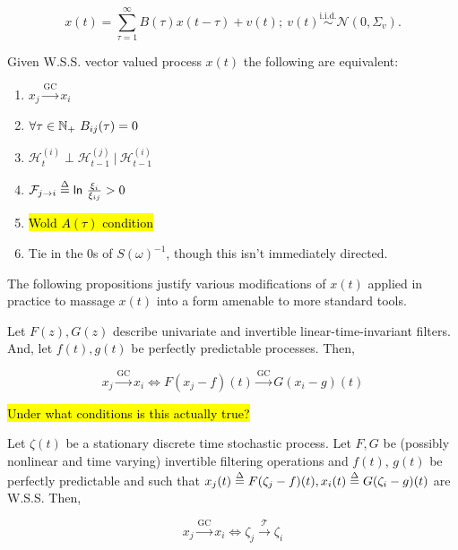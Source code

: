 \documentclass[12pt]{article}
\def\gc{\overset{\text{GC}}{\rightarrow}}
\def\te{\overset{\mathcal{T}}{\rightarrow}}
\begin{document}
\begin{equation}
  x(t) = \sum_{\tau = 1}^\infty B(\tau) x(t - \tau) + v(t);\ v(t) \overset{\text{i.i.d.}}{\sim} \mathcal{N}(0, \Sigma_v).
\end{equation}

\begin{theorem}
  Given W.S.S. vector valued process $x(t)$ the following are equivalent:

  \begin{enumerate}
    \item{$x_j \gc x_i$}
    \item{$\forall \tau \in \N_+\ B_{ij}(\tau) = 0$}
    \item{$\mathcal{H}_t^{(i)} \perp \mathcal{H}_{t - 1}^{(j)}\ |\ \mathcal{H}_{t - 1}^{(i)}$}
    \item{$\mathcal{F}_{j \rightarrow i} \overset{\Delta}{=} \mathsf{ln\ }\frac{\xi_i}{\xi_{ij}} > 0$}
    \item{\hl{Wold $A(\tau)$ condition}}
    \item{Tie in the 0s of $S(\omega)^{-1}$, though this isn't immediately directed.}
  \end{enumerate}
\end{theorem}

The following propositions justify various modifications of $x(t)$
applied in practice to massage $x(t)$ into a form amenable to more
standard tools.

\begin{theorem}
  Let $F(z), G(z)$ describe univariate and invertible
  linear-time-invariant filters.  And, let $f(t), g(t)$ be perfectly
  predictable processes.  Then,

  \begin{equation}
    x_j \gc x_i \iff F(x_j - f)(t) \gc G(x_i - g)(t)
  \end{equation}
\end{theorem}

\begin{theorem}
  \hl{Under what conditions is this actually true?}

  Let $\zeta(t)$ be a stationary discrete time stochastic process.  Let
  $F, G$ be (possibly nonlinear and time varying) invertible filtering
  operations and $f(t)$, $g(t)$ be perfectly predictable and such that
  $x_j(t) \overset{\Delta}{=} F(\zeta_j - f)(t), x_i(t) \overset{\Delta}{=} G(\zeta_i - g)(t)$ are W.S.S.  Then,

\begin{equation}
    x_j \gc x_i \iff \zeta_j \te \zeta_i
  \end{equation}
\end{theorem}
\end{document}
